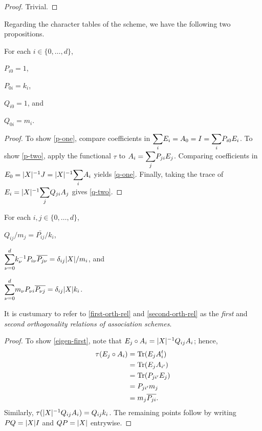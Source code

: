 \documentclass[../../../main]{subfiles}
\begin{document}
 \begin{proof}
  Trivial.
 \end{proof}
 
 Regarding the character tables of the scheme, we have the following two propositions.
 
 \begin{prop}
  For each $i \in \{0, \dots, d\}$,
  \begin{defenum}
   \item\label{p-one} $P_{i0}=1$,
   \item\label{p-two} $P_{0i}=k_i$,
   \item\label{q-one} $Q_{i0}=1$, and
   \item\label{q-two} $Q_{0i}=m_i$.
  \end{defenum}
 \end{prop}
 
 \begin{proof}
  To show \ref{p-one}, compare coefficients in $\ssum_i E_i = A_0 = I = \ssum_i P_{i0}E_i$. To show \ref{p-two}, apply the functional $\tau$ to $A_i=\ssum_j P_{ji}E_j$. Comparing coefficients in $E_0=\abs{X}^{-1}J=\abs{X}^{-1}\ssum_i A_i$ yields \ref{q-one}. Finally, taking the trace of $E_i=\abs{X}^{-1}\ssum_j Q_{ji}A_j$ gives \ref{q-two}.
 \end{proof}
 
 \begin{prop}
  For each $i,j \in \{0, \dots, d\}$,
  \begin{defenum}
   \item\label{eigen-first} $Q_{ij}/m_j=\bar{P_{ij}}/k_i$,
   \item\label{first-orth-rel} $\ssum_{\nu=0}^d k_\nu^{-1}P_{i\nu}\bar{P_{j\nu}}=\delta_{ij}\abs{X}/m_i$, and
   \item\label{second-orth-rel} $\ssum_{\nu=0}^d m_\nu P_{\nu i}\bar{P_{\nu j}}=\delta_{ij}\abs{X}k_i$.
  \end{defenum}
  It is custumary to refer to \ref{first-orth-rel} and \ref{second-orth-rel} as the {\it first} and {\it second orthogonality relations of association schemes}.
 \end{prop}
 
 \begin{proof}
  To show \ref{eigen-first}, note that $E_j \circ A_i = |X|^{-1}Q_{ij}A_i$; hence,
  \begin{align*}
   \tau(E_j \circ A_i) &= \text{Tr}(E_jA_i^t) \\
   &= \text{Tr}(E_jA_{i'}) \\
   &= \text{Tr}(P_{ji'}E_j) \\
   &= P_{ji'}m_j \\
   &= m_j\overline{P_{ji}}.
  \end{align*}
  Similarly, $\tau(|X|^{-1}Q_{ij}A_i)=Q_{ij}k_i$. The remaining points follow by writing $PQ=|X|I$ and $QP=|X|$ entrywise.
 \end{proof}
 
\end{document}
